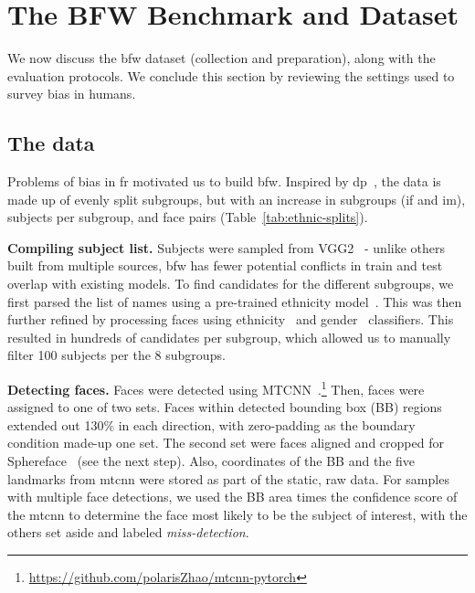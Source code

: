 \section{The BFW Benchmark and Dataset}


We now discuss the \gls{bfw} dataset (\ie collection and preparation), along with the evaluation protocols. We conclude this section by reviewing the settings used to survey bias in humans.

\subsection{The data}
Problems of bias in \gls{fr} motivated us to build \gls{bfw}. Inspired by \gls{dp}~\cite{demogPairs}, the data is made up of evenly split subgroups, but with an increase in subgroups (\ie \gls{if} and \gls{im}), subjects per subgroup, and face pairs (Table~\ref{tab:ethnic-splits}). 




\vspace{1mm}
\noindent\textbf{Compiling subject list.} 
Subjects were sampled from VGG2~\cite{Cao18} - unlike others built from multiple sources, \gls{bfw} has fewer potential conflicts in train and test overlap with existing models. To find candidates for the different subgroups, we first parsed the list of names using a pre-trained ethnicity model~\cite{ambekar2009name}. This was then further refined by processing faces using ethnicity~\cite{fu2014learning} and gender~\cite{levi2015age} classifiers. This resulted in hundreds of candidates per subgroup, which allowed us to manually filter 100 subjects per the 8 subgroups.



\vspace{1mm}
\noindent\textbf{Detecting faces.} Faces were detected using MTCNN~\cite{zhang2016joint}.\footnote{\href{https://github.com/polarisZhao/mtcnn-pytorch}{https://github.com/polarisZhao/mtcnn-pytorch}} Then, faces were assigned to one of two sets. Faces within detected bounding box (BB) regions extended out 130\% in each direction, with zero-padding as the boundary condition made-up one set. The second set were faces aligned and cropped for Sphereface~\cite{liu2017sphereface} (see the next step). Also, coordinates of the BB and the five landmarks from \gls{mtcnn} were stored as part of the static, raw data. For samples with multiple face detections, we used the BB area times the confidence score of the \gls{mtcnn} to determine the face most likely to be the subject of interest, with the others set aside and labeled \textit{miss-detection}. 



